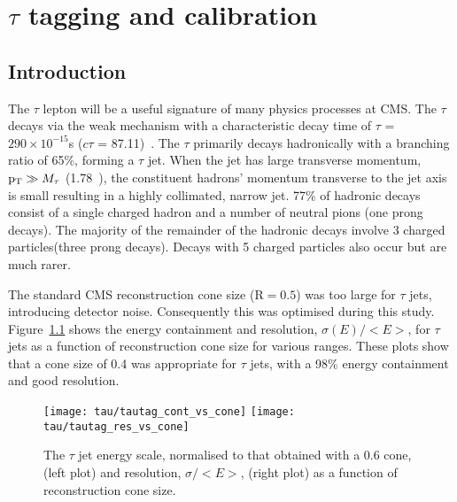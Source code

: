 \chapter{$\tau$ tagging and calibration}

\section{Introduction}


The $\tau$ lepton will be a useful signature of many physics processes at CMS. The $\tau$ decays via the weak mechanism with a characteristic decay time of $\tau$ = $290\times 10^{-15}$s ($c\tau$ = 87.11\micron)~\cite{pdg2006}. The $\tau$ primarily decays hadronically with a branching ratio of 65\%, forming a $\tau$ jet. When the jet has large transverse momentum, $\mathrm{p_{T}} \gg M_{\tau}$ (1.78~\GeVcc), the constituent hadrons' momentum transverse to the jet axis is small resulting in a highly collimated, narrow jet. 77\% of hadronic decays consist of a single charged hadron and a number of neutral pions (one prong decays). The majority of the remainder of the hadronic decays involve 3 charged particles(three prong decays). Decays with 5 charged particles also occur but are much rarer.

The standard CMS reconstruction cone size ($\mathrm R = 0.5$) was too large for $\tau$ jets, introducing detector noise. Consequently this was optimised during this study. Figure~\ref{fig:tau_scale_cone_size} shows the energy containment and resolution, $\sigma(E)/<E>$, for $\tau$ jets as a function of reconstruction cone size for various \ETMC ranges. These plots show that a cone size of 0.4 was appropriate for $\tau$ jets, with a 98\% energy containment and good resolution.

\begin{figure}[tb]
  \centering
  \texttt{[image: tau/tautag\_cont\_vs\_cone]}
  \texttt{[image: tau/tautag\_res\_vs\_cone]}
  \caption{The $\tau$ jet energy scale, normalised to that obtained with a 0.6 cone, (left plot) and resolution, $\sigma/<E>$, (right plot) as a function of reconstruction cone size.~\cite{CMS_TDR_PHYS_vol1, citeulike:800614}
  \label{fig:tau_scale_cone_size}}
\end{figure}

